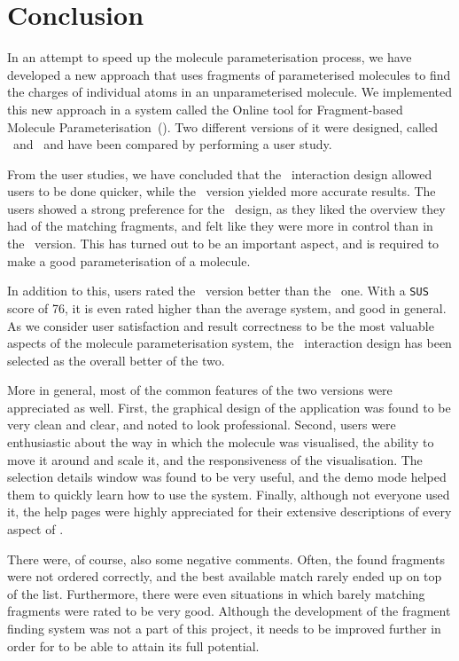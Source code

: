 \chapter{Conclusion}

In an attempt to speed up the molecule parameterisation process, we have developed a new approach that uses fragments of parameterised molecules to find the charges of individual atoms in an unparameterised molecule. We implemented this new approach in a system called the Online tool for Fragment-based Molecule Parameterisation~(\oframp). Two different versions of it were designed, called \IDa\ and \IDb\, and have been compared by performing a user study.

From the user studies, we have concluded that the \IDb\ interaction design allowed users to be done quicker, while the \IDa\ version yielded more accurate results. The users showed a strong preference for the \IDa\ design, as they liked the overview they had of the matching fragments, and felt like they were more in control than in the \IDb\ version. This has turned out to be an important aspect, and is required to make a good parameterisation of a molecule.

In addition to this, users rated the \IDa\ version better than the \IDb\ one. With a \verb|SUS| score of 76, it is even rated higher than the average system, and good in general. As we consider user satisfaction and result correctness to be the most valuable aspects of the molecule parameterisation system, the \IDa\ interaction design has been selected as the overall better of the two.

More in general, most of the common features of the two versions were appreciated as well. First, the graphical design of the application was found to be very clean and clear, and noted to look professional. Second, users were enthusiastic about the way in which the molecule was visualised, the ability to move it around and scale it, and the responsiveness of the visualisation. The selection details window was found to be very useful, and the demo mode helped them to quickly learn how to use the system. Finally, although not everyone used it, the help pages were highly appreciated for their extensive descriptions of every aspect of \oframp.

There were, of course, also some negative comments. Often, the found fragments were not ordered correctly, and the best available match rarely ended up on top of the list. Furthermore, there were even situations in which barely matching fragments were rated to be very good. Although the development of the fragment finding system was not a part of this project, it needs to be improved further in order for \oframp{} to be able to attain its full potential.


